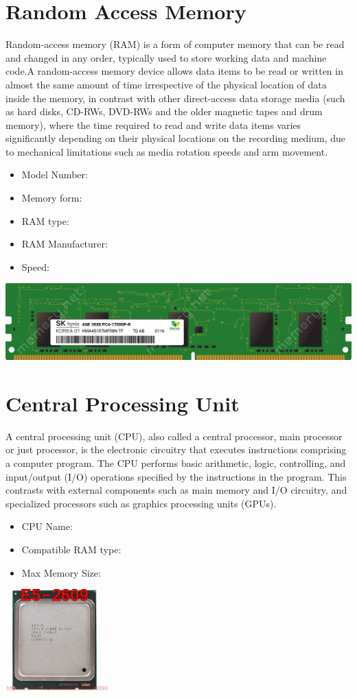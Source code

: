 \documentclass{article}
\begin{document}
\section{Random Access Memory}
Random-access memory (RAM) is a form of computer memory that can be read and changed in any order, typically used to store working data and machine code.A random-access memory device allows data items to be read or written in almost the same amount of time irrespective of the physical location of data inside the memory, in contrast with other direct-access data storage media (such as hard disks, CD-RWs, DVD-RWs and the older magnetic tapes and drum memory), where the time required to read and write data items varies significantly depending on their physical locations on the recording medium, due to mechanical limitations such as media rotation speeds and arm movement.
\begin{itemize}
  \item Model Number:
  \item Memory form:
  \item RAM type:
  \item RAM Manufacturer:
  \item Speed:
\end{itemize}
\href{https://www.datasheets360.com/pdf/4058231500629532296}{\includegraphics[width=\textwidth]{RAM.png}}
\section{Central Processing Unit}
A central processing unit (CPU), also called a central processor, main processor or just processor, is the electronic circuitry that executes instructions comprising a computer program. The CPU performs basic arithmetic, logic, controlling, and input/output (I/O) operations specified by the instructions in the program. This contrasts with external components such as main memory and I/O circuitry, and specialized processors such as graphics processing units (GPUs).
\begin{itemize}
  \item CPU Name:
  \item Compatible RAM type:
  \item Max Memory Size:
\end{itemize}
\href{http://static6.arrow.com/aropdfconversion/bc27610082f0c9042063be09408c62b0895fa247/pgurl_5465333946064300.pdf}{\includegraphics[height=4cm]{CPU.jpg}}
\end{document}

